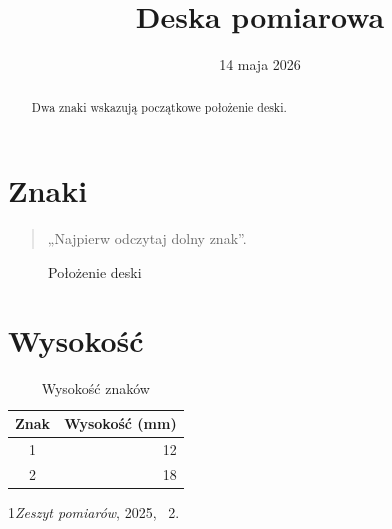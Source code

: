 \documentclass{article}
\begin{document}
\title{Deska pomiarowa}\author{}\date{14 maja 2026}\maketitle
\begin{abstract}Dwa znaki wskazują początkowe położenie deski.\end{abstract}
\tableofcontents
\section{Znaki}\begin{quote}„Najpierw odczytaj dolny znak”.\end{quote}
\begin{figure}[ht]\centering\fbox{\rule{0pt}{8mm}\rule{33mm}{0pt}}\caption{Położenie deski}\end{figure}
\section{Wysokość}
\begin{table}[ht]\centering\begin{tabular}{cr}Znak&Wysokość (mm)\\\hline 1&12\\2&18\end{tabular}\caption{Wysokość znaków}\end{table}
\begin{thebibliography}{1}\emph{Zeszyt pomiarów}, 2025, \chaptername~2.\end{thebibliography}
\end{document}
